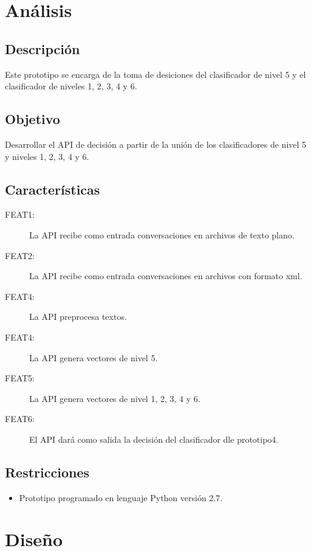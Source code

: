\section{An\'alisis}

\subsection{Descripci\'on}
Este prototipo se encarga de la toma de desiciones del clasificador de nivel 5 y el clasificador de niveles  1, 2, 3, 4 y 6.

\subsection{Objetivo}
Desarrollar el API de decisi\'on a partir de la uni\'on de los clasificadores de nivel 5 y niveles 1, 2, 3, 4 y 6.

\subsection{Caracter\'isticas}
\begin{description}
\item[FEAT1:] La API recibe como entrada conversaciones en archivos de texto plano.
\item[FEAT2:] La API recibe como entrada conversaciones en archivos con formato xml.
\item[FEAT4:] La API preprocesa textos.
\item[FEAT4:] La API genera vectores de nivel 5.
\item[FEAT5:] La API genera vectores de nivel  1, 2, 3, 4 y 6.
\item[FEAT6:] El API dar\'a como salida la decisi\'on del clasificador dle prototipo4.

\end{description}

\subsection{Restricciones}
\begin{itemize}
\item Prototipo programado en lenguaje Python versi\'on 2.7.
\end{itemize}



\section{Dise\~no}


